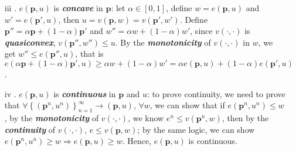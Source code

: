 \begin{enumerate}
\begin{enumerate}
        \item[iii] . $e(\mathbf{p},u)$ is \textit{\textbf{concave}} in $\mathbf{p}$: let $\alpha\in[0,1]$, define $w=e(\mathbf{p},u)$ and $w'=e(\mathbf{p}',u)$, then $u=v(\mathbf{p},w)=v(\mathbf{p}',w')$. Define $\mathbf{p}''=\alpha \mathbf{p}+(1-\alpha)\mathbf{p}'$ and $w''=\alpha w+(1-\alpha) w'$, since $v(\cdot,\cdot)$ is \textit{\textbf{quasiconvex}}, $v(\mathbf{p}'',w'')\leq u$. By the \textit{\textbf{monotonicity}} of $v(\cdot,\cdot)$ in $w$, we get $w''\leq e(\mathbf{p}'',u)$, that is $e(\alpha \mathbf{p}+(1-\alpha)\mathbf{p}',u)\geq \alpha w +(1-\alpha)w'=\alpha e(\mathbf{p},u)+(1-\alpha)e(\mathbf{p}',u)$.
        \item[iv] . $e(\mathbf{p},u)$ is \textit{\textbf{continuous}} in $\mathbf{p}$ and $u$: to prove continuity, we need to prove that $\forall \left\{\left(\mathbf{p}^n,u^n\right)\right\}^{\infty}_{n=1} \rightarrow (\mathbf{p},u)$, $\forall w$, we can show that if $e(\mathbf{p}^n,u^n)\leq w$, by the \textit{\textbf{monotonicity}} of $v(\cdot,\cdot)$, we know $e^n\leq v(\mathbf{p}^n,w)$, then by the \textit{\textbf{continuity}} of $v(\cdot,\cdot)$, $e\leq v(\mathbf{p},w)$; by the same logic, we can show $e(\mathbf{p}^n,u^n)\geq w\Rightarrow e(\mathbf{p},u)\geq w$. Hence, $e(\mathbf{p},u)$ is continuous.
    \end{enumerate} 


\end{enumerate}
